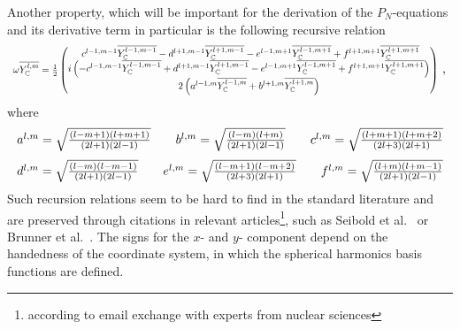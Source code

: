 Another property, which will be important for the derivation of the $P_N$-equations and its derivative term in particular is the following recursive relation
\begin{equation}
\label{eq:recursive_relation}
\resizebox{1.0\hsize}{!}{$\omega\overline{\SHBC^{l,m}} = \frac{1}{2}
\begin{pmatrix}
\ c^{l-1, m-1}\overline{\SHBC^{l-1,m-1}} - d^{l+1, m-1}\overline{\SHBC^{l+1,m-1}} - e^{l-1, m+1}\overline{\SHBC^{l-1,m+1}} + f^{l+1, m+1}\overline{\SHBC^{l+1,m+1}}\\
i\left(-c^{l-1, m-1}\overline{\SHBC^{l-1,m-1}} + d^{l+1, m-1}\overline{\SHBC^{l+1,m-1}} - e^{l-1, m+1}\overline{\SHBC^{l-1,m+1}} + f^{l+1, m+1}\overline{\SHBC^{l+1,m+1}}\right) \\
2\left(a^{l-1, m}\overline{\SHBC^{l-1,m}}+b^{l+1, m}\overline{\SHBC^{l+1,m}}\right)
\end{pmatrix}$}
\ ,
\end{equation}
where
\begin{equation*}
\resizebox{1.0\hsize}{!}{$
a^{l,m}= \sqrt{\frac{\left(l-m+1\right)\left(l+m+1\right)}{\left(2l+1\right)\left(2l-1\right)}} \qquad
b^{l,m}= \sqrt{\frac{\left(l-m\right)\left(l+m\right)}{\left(2l+1\right)\left(2l-1\right)}} \qquad
c^{l,m}= \sqrt{\frac{\left(l+m+1\right)\left(l+m+2\right)}{\left(2l+3\right)\left(2l+1\right)}}
$}
\end{equation*}
\begin{equation*}
\resizebox{1.0\hsize}{!}{$
d^{l,m}= \sqrt{\frac{\left(l-m\right)\left(l-m-1\right)}{\left(2l+1\right)\left(2l-1\right)}} \qquad
e^{l,m}= \sqrt{\frac{\left(l-m+1\right)\left(l-m+2\right)}{\left(2l+3\right)\left(2l+1\right)}} \qquad
f^{l,m}= \sqrt{\frac{\left(l+m\right)\left(l+m-1\right)}{\left(2l+1\right)\left(2l-1\right)}}
$}
\end{equation*}
Such recursion relations seem to be hard to find in the standard literature and are preserved through citations in relevant articles\footnote{according to email exchange with experts from nuclear sciences}, such as Seibold et al.~\cite{Seibold14} or Brunner et al.~\cite{Brunner05}. The signs for the $x$- and $y$- component depend on the handedness of the coordinate system, in which the spherical harmonics basis functions are defined.
